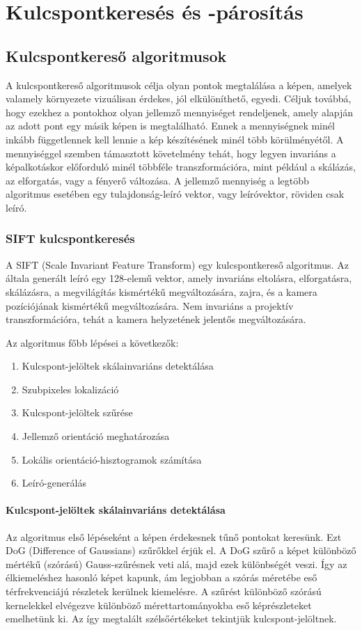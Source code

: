 \chapter{Kulcspontkeresés és -párosítás}
\section{Kulcspontkereső algoritmusok}
	
	A kulcspontkereső algoritmusok célja olyan pontok megtalálása a képen, amelyek valamely környezete vizuálisan érdekes, jól elkülöníthető, egyedi. Céljuk továbbá, hogy ezekhez a pontokhoz olyan jellemző mennyiséget rendeljenek, amely alapján az adott pont egy másik képen is megtalálható. Ennek a mennyiségnek minél inkább függetlennek kell lennie a kép készítésének minél több körülményétől. A mennyiséggel szemben támasztott követelmény tehát, hogy legyen invariáns a képalkotáskor előforduló minél többféle transzformációra, mint például a skálázás, az elforgatás, vagy a fényerő változása. A jellemző mennyiség a legtöbb algoritmus esetében egy tulajdonság-leíró vektor, vagy leíróvektor, röviden csak leíró.
	
	\subsection{SIFT kulcspontkeresés}
	
	A SIFT (Scale Invariant Feature Transform) \cite{LoweSIFT} egy kulcspontkereső algoritmus. Az általa generált leíró egy 128-elemű vektor, amely invariáns eltolásra, elforgatásra, skálázásra, a megvilágítás kismértékű megváltozására, zajra, és a kamera pozíciójának kismértékű megváltozására. Nem invariáns a projektív transzformációra, tehát a kamera helyzetének jelentős megváltozására.
	
	Az algoritmus főbb lépései a következők:
	
	\begin{enumerate}
	\item Kulcspont-jelöltek skálainvariáns detektálása
	\item Szubpixeles lokalizáció
	\item Kulcspont-jelöltek szűrése
	\item Jellemző orientáció meghatározása
	\item Lokális orientáció-hisztogramok számítása
	\item Leíró-generálás
	\end{enumerate}
	
	\subsubsection{Kulcspont-jelöltek skálainvariáns detektálása}
	Az algoritmus első lépéseként a képen érdekesnek tűnő pontokat keresünk. Ezt DoG (Difference of Gaussians) szűrőkkel érjük el. A DoG szűrő a képet különböző mértékű (szórású) Gauss-szűrésnek veti alá, majd ezek különbségét veszi. Így az élkiemeléshez hasonló képet kapunk, ám legjobban a szórás méretébe eső térfrekvenciájú részletek kerülnek kiemelésre. A szűrést különböző szórású kernelekkel elvégezve különböző mérettartományokba eső képrészleteket emelhetünk ki. Az így megtalált szélsőértékeket tekintjük kulcspont-jelöltnek.
	
